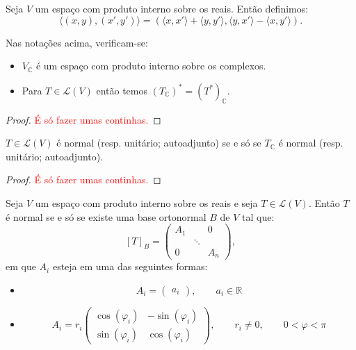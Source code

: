 \documentclass[11pt,twoside,a4paper]{book}
\begin{document}
\begin{definicao}
Seja $V$ um espaço com produto interno sobre os reais. Então definimos:
\[
\langle(x,y),(x',y')\rangle=\left(\langle x,x'\rangle+\langle y,y'\rangle,\langle y,x'\rangle-\langle x,y'\rangle\right).
\]
\end{definicao}

\begin{proposicao}
Nas notações acima, verificam-se:
\begin{itemize}
\item $V_\mathbb{C}$ é um espaço com produto interno sobre os complexos.
\item Para $T\in\mathcal{L}(V)$ então temos $(T_\mathbb{C})^*=(T^*)_\mathbb{C}.$
\end{itemize}
\end{proposicao}
\begin{proof}
\textcolor{red}{É só fazer umas continhas.}
\end{proof}

\begin{corolario}
$T\in\mathcal{L}(V)$ é normal (resp. unitário; autoadjunto) se e só se $T_\mathbb{C}$ é normal (resp. unitário; autoadjunto).
\end{corolario}
\begin{proof}
\textcolor{red}{É só fazer umas continhas.}
\end{proof}

\begin{teorema}
Seja $V$ um espaço com produto interno sobre os reais e seja $T\in\mathcal{L}(V)$. Então $T$ é normal se e só se existe uma base ortonormal $B$ de $V$ tal que:
\[
[T]_B=\begin{pmatrix}
A_1&&0\\&\ddots&\\0&&A_n
\end{pmatrix},
\]
em que $A_i$ esteja em uma das seguintes formas:
\begin{itemize}
\item
\[
A_i=\begin{pmatrix}
a_i
\end{pmatrix},\quad\quad a_i\in\mathbb{R}
\]
\item
\[
A_i=r_i\begin{pmatrix}
\cos(\varphi_i)&-\sin(\varphi_i)\\\sin(\varphi_i)&\cos(\varphi_i)
\end{pmatrix},\quad\quad r_i\neq 0,\quad\quad0<\varphi<\pi
\]
\end{itemize}
\end{teorema}
\end{document}
